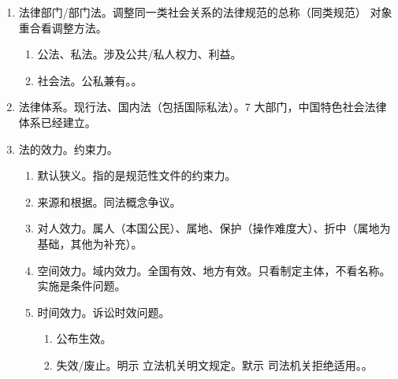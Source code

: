 \begin{enumerate}
\begin{enumerate}
          \item 非正式渊源。较弱效力但具有法律说服力、没获得官方认同、可以考虑。
                \begin{enumerate}
                  \item 适用前提。填补漏洞、辅助理解。。
                  \item 法理（行业认同）、判例、道德（公众认同）、正义标准、习惯（\bdy 习惯法）、政策。
                \end{enumerate}
          \item 效力原则。
                \begin{enumerate}
                  \item 同一主体。新法优于旧法；特别法优于一般法；交叉（新法是一般法），制定机关裁决。
                  \item 法规、规章 \yjt 国务院 \yjt 用规章 \yjt 全人常。
                \end{enumerate}
        \end{enumerate}
  \item 法律部门/部门法。调整同一类社会关系的法律规范的总称（同类规范） \yjt 对象重合看调整方法。
        \begin{enumerate}
          \item 公法、私法。涉及公共/私人权力、利益。
          \item 社会法。公私兼有。。
        \end{enumerate}
  \item 法律体系。现行法、国内法（包括国际私法）。7 大部门，中国特色社会法律体系已经建立。
  \item 法的效力。约束力。
        \begin{enumerate}
          \item 默认狭义。指的是规范性文件的约束力。
          \item 来源和根据。同法概念争议。
          \item 对人效力。属人（本国公民）、属地、保护（操作难度大）、折中（属地为基础，其他为补充）。
          \item 空间效力。域内效力。全国有效、地方有效。只看制定主体，不看名称。实施是条件问题。
          \item 时间效力。诉讼时效问题。
                \begin{enumerate}
                  \item 公布生效。
                  \item 失效/废止。明示 \yjt 立法机关明文规定。默示 \yjt 司法机关拒绝适用。。

\end{enumerate}
\end{enumerate}
\end{enumerate}
